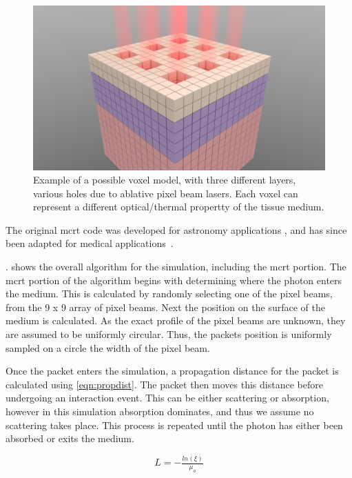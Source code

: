 \begin{figure}
\centering
\includegraphics[scale=0.25]{./ablation/images/voxel-model-render.png}
\caption{Example of a possible voxel model, with three different layers, various holes due to ablative pixel beam lasers. Each voxel can represent a different optical/thermal propertty of the tissue medium.}\label{fig:voxel-model}
\end{figure}

The original \gls{mcrt} code was developed for astronomy applications \cite{wood1999model,wood2005estimating}, and has since been adapted for medical applications~\cite{campbell2015monte,barnard2018quantifying}.

. shows the overall algorithm for the simulation, including the \gls{mcrt} portion. 
The \gls{mcrt} portion of the algorithm begins with determining where the photon enters the medium. This is calculated by randomly selecting one of the pixel beams, from the 9 x 9 array of pixel beams. Next the position on the surface of the medium is calculated. As the exact profile of the pixel beams are unknown, they are assumed to be uniformly circular. Thus, the packets position is uniformly sampled on a circle the width of the pixel beam.

Once the packet enters the simulation, a propagation distance for the packet is calculated using \cref{eqn:propdist}. The packet then moves this distance before undergoing an interaction event. This can be either scattering or absorption, however in this simulation absorption dominates, and thus we assume no scattering takes place. This process is repeated until the photon has either been absorbed or exits the medium.

\begin{equation}
L = -\tfrac{ln(\xi)}{\mu_a}
\label{eqn:propdist}
\end{equation}

